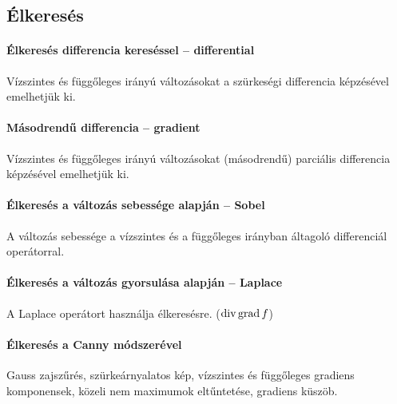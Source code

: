 \documentclass[../../main.tex]{subfiles}
\begin{document}
\subsection{Élkeresés}

\paragraph{Élkeresés differencia kereséssel -- differential}

Vízszintes és függőleges irányú változásokat a szürkeségi differencia képzésével
emelhetjük ki.

\paragraph{Másodrendű differencia -- gradient}

Vízszintes és függőleges irányú változásokat (másodrendű) parciális differencia
képzésével emelhetjük ki.

\paragraph{Élkeresés a változás sebessége alapján -- Sobel}

A változás sebessége a vízszintes és a függőleges irányban áltagoló
differenciál operátorral.

\paragraph{Élkeresés a változás gyorsulása alapján -- Laplace}

A Laplace operátort használja élkeresésre. ($\operatorname{div} \operatorname{grad} f$)

\paragraph{Élkeresés a Canny módszerével}

Gauss zajszűrés, szürkeárnyalatos kép, vízszintes és függőleges gradiens
komponensek, közeli nem maximumok eltűntetése, gradiens küszöb.
\end{document}

